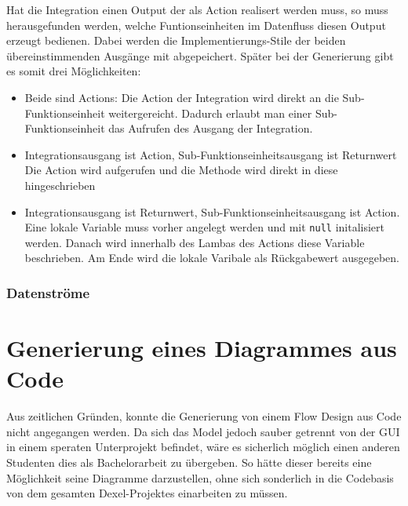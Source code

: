 \begin{enumerate}
		Hat die Integration einen Output der als Action realisert werden muss, so
		muss herausgefunden werden, welche Funtionseinheiten im Datenfluss diesen
		Output erzeugt bedienen. Dabei werden die Implementierungs-Stile der
		beiden übereinstimmenden Ausgänge mit abgepeichert. Später bei der
		Generierung gibt es somit drei Möglichkeiten:
		\begin{itemize}
			\item Beide sind Actions:
			Die Action der Integration wird direkt an die Sub-Funktionseinheit
			weitergereicht. Dadurch erlaubt man einer Sub-Funktionseinheit das
			Aufrufen des Ausgang der Integration.
			\item Integrationsausgang ist Action, Sub-Funktionseinheitsausgang ist
			Returnwert 
			Die Action wird aufgerufen und die Methode wird direkt in diese
			hingeschrieben
			\item Integrationsausgang ist Returnwert, Sub-Funktionseinheitsausgang ist
			Action.
			Eine lokale Variable muss vorher angelegt werden und mit \texttt{null}
			initalisiert werden. Danach wird innerhalb des Lambas des Actions diese
			Variable beschrieben. Am Ende wird die lokale Varibale als Rückgabewert
			ausgegeben.
		\end{itemize}
	\end{enumerate}
	
	
	\subsubsection{Datenströme}


\section{Generierung eines Diagrammes aus Code}

Aus zeitlichen Gründen, konnte die Generierung von einem Flow Design aus Code nicht angegangen werden. 
Da sich das Model jedoch sauber getrennt von der GUI in
einem speraten Unterprojekt befindet, wäre es sicherlich möglich einen anderen
Studenten dies als Bachelorarbeit zu übergeben. So hätte dieser bereits eine
Möglichkeit seine Diagramme darzustellen, ohne sich sonderlich in die
Codebasis von dem gesamten Dexel-Projektes einarbeiten zu müssen.